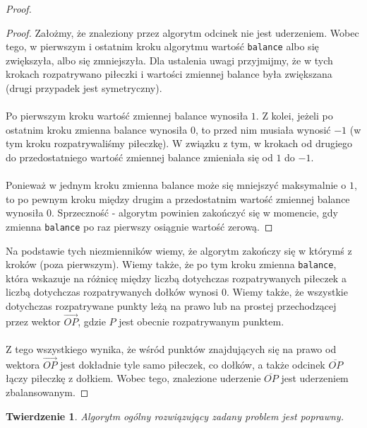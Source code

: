 \documentclass[10pt,a4paper]{article}
\newtheorem{theorem}{Twierdzenie}
\begin{document}
\begin{proof}
\begin{addmargin}[1.25em]{0em}
			\begin{proof}
				Założmy, że znaleziony przez algorytm odcinek nie jest uderzeniem. Wobec tego, w pierwszym i ostatnim kroku algorytmu wartość \texttt{balance} albo się zwiększyła, albo się zmniejszyła. Dla ustalenia uwagi przyjmijmy, że w tych krokach rozpatrywano piłeczki i wartości zmiennej balance była zwiększana (drugi przypadek jest symetryczny).\\~\\
				Po pierwszym kroku wartość zmiennej balance wynosiła $1$. Z kolei, jeżeli po ostatnim kroku zmienna balance wynosiła $0$, to przed nim musiała wynosić $-1$ (w tym kroku rozpatrywaliśmy piłeczkę). W związku z tym, w krokach od drugiego do przedostatniego wartość zmiennej balance zmieniała się od $1$ do $-1$. \\~\\
				Ponieważ w jednym kroku zmienna balance może się mniejszyć maksymalnie o $1$, to po pewnym kroku między drugim a przedostatnim wartość zmiennej balance wynosiła $0$. Sprzeczność - algorytm powinien zakończyć się w momencie, gdy zmienna \texttt{balance} po raz pierwszy osiągnie wartość zerową.
			\end{proof}
		\end{addmargin}

		Na podstawie tych niezmienników wiemy, że algorytm zakończy się w którymś z kroków (poza pierwszym). Wiemy także, że po tym kroku zmienna \texttt{balance}, która wskazuje na różnicę między liczbą dotychczas rozpatrywanych piłeczek a liczbą dotychczas rozpatrywanych dołków wynosi $0$. Wiemy także, że wszystkie dotychczas rozpatrywane punkty leżą na prawo lub na prostej przechodzącej przez wektor $\overrightarrow{OP}$, gdzie $P$ jest obecnie rozpatrywanym punktem.\\~\\
		Z tego wszystkiego wynika, że wśród punktów znajdujących się na prawo od wektora $\overrightarrow{OP}$ jest dokładnie tyle samo piłeczek, co dołków, a także odcinek $\overline{OP}$ łączy piłeczkę z dołkiem. Wobec tego, znalezione uderzenie $\overline{OP}$ jest uderzeniem zbalansowanym.
	\end{proof}

	\vspace{2em}

	\begin{theorem} \label{theorem:2}
		Algorytm ogólny rozwiązujący zadany problem jest poprawny.
	\end{theorem}
	
\end{document}
